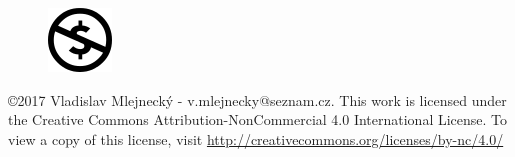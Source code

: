 \documentclass[11pt, a4paper]{article}
\begin{document}
\begin{figure}[h]
\begin{minipage}{.06\textwidth}
\end{minipage}
\begin{minipage}{.06\textwidth}
  \centering
  \includegraphics[width=.9\linewidth]{img/lic/nc.png}
\end{minipage}
\end{figure}
\begin{flushleft}
    \copyright  2017 Vladislav Mlejnecký - v.mlejnecky@seznam.cz.
    This work is licensed under the Creative Commons Attribution-NonCommercial 4.0 International License.
    To view a copy of this license, visit \url{http://creativecommons.org/licenses/by-nc/4.0/}
\end{flushleft}
\newpage
{}
\tableofcontents
\newpage
\listoffigures
\newpage
\listoftables
\newpage
{}
\end{document}
